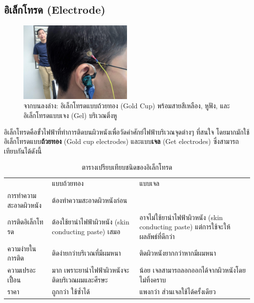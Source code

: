 \subsection{อิเล็กโทรด (Electrode)}

\begin{figure}[h]
    \centering
    \includegraphics[width=0.5\textwidth]{images/IMG_20190610_155141.jpg}
    \caption{จากบนลงล่าง: อิเล็กโทรดแบบถ้วยทอง (Gold Cup) พร้อมสายสีเหลือง, หูฟัง, และอิเล็กโทรดแบบเจง (Gel) บริเวณติ่งหู}
\end{figure}

อิเล็กโทรดคือขั้วไฟฟ้าที่ทำการติดบนผิวหนังเพื่อวัดค่าศักย์ไฟฟ้าบริเวณจุดต่างๆ ที่สนใจ โดยมากมักใช้อิเล็กโทรดแบบ\textbf{ถ้วยทอง}
(Gold cup electrodes) และแบบ\textbf{เจล} (Get electrodes) ซึ่งสามารถเทียบกันได้ดังนี้

\begin{table}[H]
    \centering
    \begin{tabularx}{\textwidth}{l|X|X}
         & แบบถ้วยทอง & แบบเจล\\
        \hhline{===}
        การทำความสะอาดผิวหนัง  & \multicolumn{2}{l}{ต้องทำความสะอาดผิวหนังก่อน}\\
        \hline
        การติดอิเล็กโทรด & ต้องใช้ยานำไฟฟ้าผิวหนัง (skin conducting paste) เสมอ  & อาจไม่ใช้ยานำไฟฟ้าผิวหนัง (skin conducting paste) แต่การใช้จะให้ผลลัพธ์ที่ดีกว่า \\
        \hline
        ความง่ายในการติด & ติดง่ายกว่าบริเวณที่มีผมหนา & ติดผิวหนังยากกว่าหากมีผมหนา\\
        \hline
        ความเปรอะเปื้อน & มาก เพราะยานำไฟฟ้าผิวหนังจะติดบริเวณผมและศีรษะ & น้อย เจลสามารถลอกออกได้จากผิวหนังโดยไม่ทิ้งคราบ\\
        \hline
        ราคา & ถูกกว่า ใช้ซ้ำได้ & แพงกว่า ส่วนเจลใช้ได้ครั้งเดียว\\
    \end{tabularx}
    \caption{ตารางเปรียบเทียบชนิดของอิเล็กโทรด}
\end{table}

